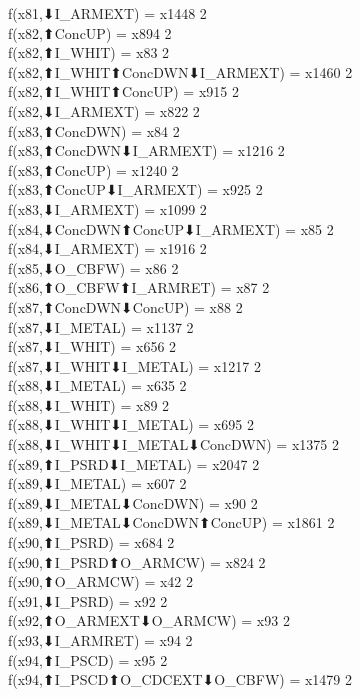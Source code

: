 f(x81,⬇I_ARMEXT) = x1448 {2} \\
f(x82,⬆ConcUP) = x894 {2} \\
f(x82,⬆I_WHIT) = x83 {2} \\
f(x82,⬆I_WHIT⬆ConcDWN⬇I_ARMEXT) = x1460 {2} \\
f(x82,⬆I_WHIT⬆ConcUP) = x915 {2} \\
f(x82,⬇I_ARMEXT) = x822 {2} \\
f(x83,⬆ConcDWN) = x84 {2} \\
f(x83,⬆ConcDWN⬇I_ARMEXT) = x1216 {2} \\
f(x83,⬆ConcUP) = x1240 {2} \\
f(x83,⬆ConcUP⬇I_ARMEXT) = x925 {2} \\
f(x83,⬇I_ARMEXT) = x1099 {2} \\
f(x84,⬇ConcDWN⬆ConcUP⬇I_ARMEXT) = x85 {2} \\
f(x84,⬇I_ARMEXT) = x1916 {2} \\
f(x85,⬇O_CBFW) = x86 {2} \\
f(x86,⬆O_CBFW⬆I_ARMRET) = x87 {2} \\
f(x87,⬆ConcDWN⬇ConcUP) = x88 {2} \\
f(x87,⬇I_METAL) = x1137 {2} \\
f(x87,⬇I_WHIT) = x656 {2} \\
f(x87,⬇I_WHIT⬇I_METAL) = x1217 {2} \\
f(x88,⬇I_METAL) = x635 {2} \\
f(x88,⬇I_WHIT) = x89 {2} \\
f(x88,⬇I_WHIT⬇I_METAL) = x695 {2} \\
f(x88,⬇I_WHIT⬇I_METAL⬇ConcDWN) = x1375 {2} \\
f(x89,⬆I_PSRD⬇I_METAL) = x2047 {2} \\
f(x89,⬇I_METAL) = x607 {2} \\
f(x89,⬇I_METAL⬇ConcDWN) = x90 {2} \\
f(x89,⬇I_METAL⬇ConcDWN⬆ConcUP) = x1861 {2} \\
f(x90,⬆I_PSRD) = x684 {2} \\
f(x90,⬆I_PSRD⬆O_ARMCW) = x824 {2} \\
f(x90,⬆O_ARMCW) = x42 {2} \\
f(x91,⬇I_PSRD) = x92 {2} \\
f(x92,⬆O_ARMEXT⬇O_ARMCW) = x93 {2} \\
f(x93,⬇I_ARMRET) = x94 {2} \\
f(x94,⬆I_PSCD) = x95 {2} \\
f(x94,⬆I_PSCD⬆O_CDCEXT⬇O_CBFW) = x1479 {2} \\
